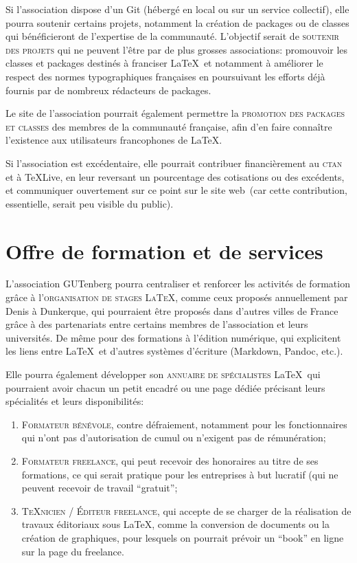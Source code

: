 \documentclass{tufte-handout}
\newcommand{\ratio}[3][]{\marginpar{\footnotesize{\textcolor{teal}{Temps requis: #2 / Utilité: #3}\par\noindent \textcolor{teal}{#1}}}}
\begin{document}
Si l'association dispose d'un Git\ratio[Sur la base du bénévolat uniquement]{+}{++} (hébergé en local ou sur un service collectif), elle pourra soutenir certains projets, notamment la création de packages ou de classes qui bénéficieront de l'expertise de la communauté. L'objectif serait de \textsc{soutenir des projets} qui ne peuvent l'être par de plus grosses associations: promouvoir les classes et packages destinés à franciser \LaTeX\, et notamment à améliorer le respect des normes typographiques françaises en poursuivant les efforts déjà fournis par de nombreux rédacteurs de packages.

Le site de l'association\ratio[Simple mise à jour du site]{+}{+++} pourrait également permettre la \textsc{promotion des packages et classes} des membres de la communauté française, afin d'en faire connaître l'existence aux utilisateurs francophones de \LaTeX.

Si l'association est excédentaire\ratio[C'est encore un futur éloigné]{+}{+++}, elle pourrait contribuer financièrement au \textsc{ctan} et à \TeX Live, en leur reversant un pourcentage des cotisations ou des excédents, et communiquer ouvertement sur ce point sur le site web~(car cette contribution, essentielle, serait peu visible du public).


\section{Offre de formation et de services}

L'association GUTenberg\ratio[Chronophage, mais utile et potentiellement rémunéré]{+++}{+++} pourra centraliser et renforcer les activités de formation grâce à l'\textsc{organisation de stages \LaTeX}, comme ceux proposés annuellement par Denis  à Dunkerque, qui pourraient être proposés dans d'autres villes de France grâce à des partenariats entre certains membres de l'association et leurs universités. De même pour des formations à l'édition numérique, qui explicitent les liens entre \LaTeX\ et d'autres systèmes d'écriture (Markdown, Pandoc, etc.).

Elle pourra également\ratio[Gestion par les intéressés, autorisés par les administrateurs du site web]{+}{++} développer son \textsc{annuaire de spécialistes} \LaTeX\ qui pourraient avoir chacun un petit encadré ou une page dédiée précisant leurs spécialités et leurs disponibilités:
\begin{enumerate}
	\item\textsc{Formateur bénévole}, contre défraiement, notamment pour les fonctionnaires qui n'ont pas d'autorisation de cumul ou n'exigent pas de rémunération;
	\item\textsc{Formateur freelance}, qui peut recevoir des honoraires au titre de ses formations, ce qui serait pratique pour les entreprises à but lucratif (qui ne peuvent recevoir de travail \enquote{gratuit};
	\item\textsc{\TeX nicien / Éditeur freelance}, qui accepte de se charger de la réalisation de travaux éditoriaux sous \LaTeX, comme la conversion de documents ou la création de graphiques, pour lesquels on pourrait prévoir un \enquote{book} en ligne sur la page du freelance.
\end{enumerate}
\end{document}
